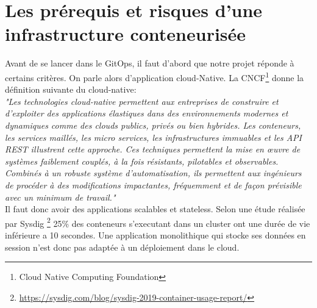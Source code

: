 \documentclass[11pt,fleqn]{book} %
\begin{document}
\section{Les prérequis et risques d'une infrastructure conteneurisée}
Avant de se lancer dans le GitOps, il faut d'abord que notre projet réponde à certains critères. On parle alors d'application cloud-Native. La CNCF\footnote{Cloud Native Computing Foundation} donne la définition suivante du cloud-native: \\

\textit{"Les technologies cloud-native permettent aux entreprises de construire et d'exploiter des applications élastiques dans des environnements modernes et dynamiques comme des clouds publics, privés ou bien hybrides. Les conteneurs, les services maillés, les micro services, les infrastructures immuables et les API REST illustrent cette approche. Ces techniques permettent la mise en œuvre de systèmes faiblement couplés, à la fois résistants, pilotables et observables. Combinés à un robuste système d'automatisation, ils permettent aux ingénieurs de procéder à des modifications impactantes, fréquemment et de façon prévisible avec un minimum de travail."} \\

Il faut donc avoir des applications scalables et stateless. Selon une étude réalisée par Sysdig \footnote{\url{https://sysdig.com/blog/sysdig-2019-container-usage-report/}} 25\% des conteneurs s'executant dans un cluster ont une durée de vie inférieure a 10 secondes. Une application monolithique qui stocke ses données en session n'est donc pas adaptée à un déploiement dans le cloud.  \\
\end{document}
